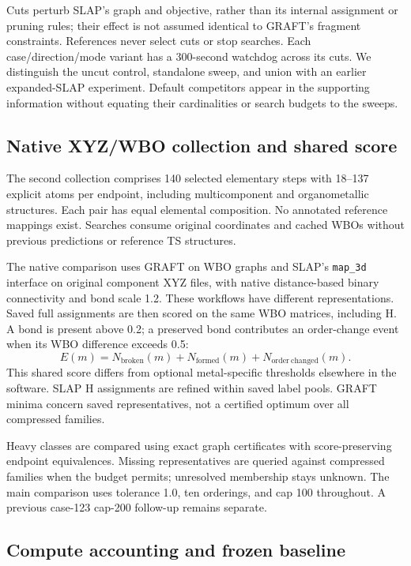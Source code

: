 Cuts perturb SLAP's graph and objective, rather than its internal assignment or pruning rules; their effect is not assumed identical to GRAFT's fragment constraints. References never select cuts or stop searches. Each case/direction/mode variant has a 300-second watchdog across its cuts. We distinguish the uncut control, standalone sweep, and union with an earlier expanded-SLAP experiment. Default competitors appear in the supporting information without equating their cardinalities or search budgets to the sweeps.

\subsection{Native XYZ/WBO collection and shared score}

The second collection comprises 140 selected elementary steps with 18--137 explicit atoms per endpoint, including multicomponent and organometallic structures. Each pair has equal elemental composition. No annotated reference mappings exist. Searches consume original coordinates and cached WBOs without previous predictions or reference TS structures.

The native comparison uses GRAFT on WBO graphs and SLAP's \texttt{map\_3d} interface on original component XYZ files, with native distance-based binary connectivity and bond scale 1.2. These workflows have different representations. Saved full assignments are then scored on the same WBO matrices, including H. A bond is present above 0.2; a preserved bond contributes an order-change event when its WBO difference exceeds 0.5:
\begin{equation}
E(m)=N_{\mathrm{broken}}(m)+N_{\mathrm{formed}}(m)+N_{\mathrm{order\ changed}}(m).
\end{equation}
This shared score differs from optional metal-specific thresholds elsewhere in the software. SLAP H assignments are refined within saved label pools. GRAFT minima concern saved representatives, not a certified optimum over all compressed families.

Heavy classes are compared using exact graph certificates with score-preserving endpoint equivalences. Missing representatives are queried against compressed families when the budget permits; unresolved membership stays unknown. The main comparison uses tolerance 1.0, ten orderings, and cap 100 throughout. A previous case-123 cap-200 follow-up remains separate.

\subsection{Compute accounting and frozen baseline}

